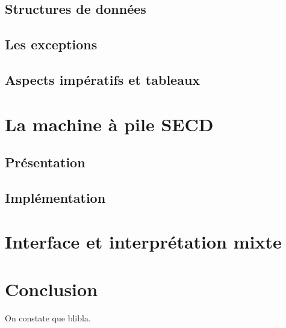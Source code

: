 \documentclass{article}
\begin{document}
\subsection{Structures de données}

\subsection{Les exceptions}

\subsection{Aspects impératifs et tableaux}

\section{La machine à pile SECD}

\subsection{Présentation}

\subsection{Implémentation}


\section{Interface et interprétation mixte}

\section*{Conclusion}

On constate que blibla.

\nocite{*}


\end{document}
